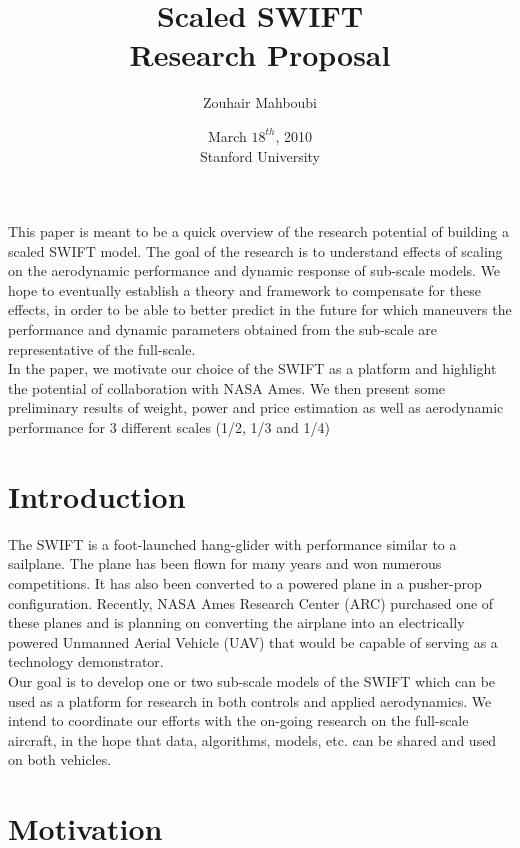 \documentclass[titlepage,10pt]{article}
\begin{document}
\title{
Scaled SWIFT \\
Research Proposal
}

\author{Zouhair Mahboubi}

\date{March $18^{th}$, 2010\\ Stanford University}

\maketitle
\newpage

\abstract
This paper is meant to be a quick overview of the research potential of building a scaled SWIFT model. The goal of the research is to understand effects of scaling on the aerodynamic performance and dynamic response of sub-scale models. We hope to eventually establish a theory and framework to compensate for these effects, in order to be able to better predict in the future for which maneuvers the performance and dynamic parameters obtained from the sub-scale are representative of the full-scale. \\

In the paper, we motivate our choice of the SWIFT as a platform and highlight the potential of collaboration with NASA Ames. We then present some preliminary results of weight, power and price estimation as well as aerodynamic performance for 3 different scales (1/2, 1/3 and 1/4) 

\newpage
\section{Introduction}
The SWIFT is a foot-launched hang-glider with performance similar to a sailplane. The plane has been flown for many years and won numerous competitions. It has also been converted to a powered plane in a pusher-prop configuration. Recently, NASA Ames Research Center (ARC) purchased one of these planes and is planning on converting the airplane into an electrically powered Unmanned Aerial Vehicle (UAV) that would be capable of serving as a technology demonstrator.\\
Our goal is to develop one or two sub-scale models of the SWIFT which can be used as a platform for research in both controls and applied aerodynamics. We intend to coordinate our efforts with the on-going research on the full-scale aircraft, in the hope that data, algorithms, models, etc. can be shared and used on both vehicles.

\section{Motivation}
\end{document}
